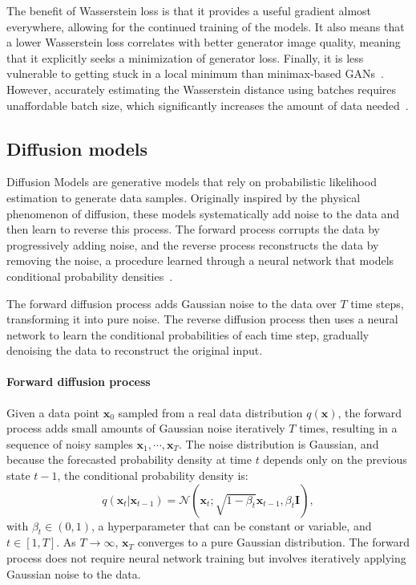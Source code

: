 \documentclass[sn-mathphys-num]{sn-jnl}%
\begin{document}
    The benefit of Wasserstein loss is that it provides a useful gradient almost everywhere, allowing for the continued training of the models. It also means that a lower Wasserstein loss correlates with better generator image quality, meaning that it explicitly seeks a minimization of generator loss. Finally, it is less vulnerable to getting stuck in a local minimum than minimax-based GANs~\cite{Wasserstein}. However, accurately estimating the Wasserstein distance using batches requires unaffordable batch size, which significantly increases the amount of data needed~\cite{stanczuk2021wasserstein}.


\subsection{Diffusion models}\label{sec:diffusion}
Diffusion Models are generative models that rely on probabilistic likelihood estimation to generate data samples. Originally inspired by the physical phenomenon of diffusion, these models systematically add noise to the data and then learn to reverse this process. The forward process corrupts the data by progressively adding noise, and the reverse process reconstructs the data by removing the noise, a procedure learned through a neural network that models conditional probability densities~\cite{sohl2015deep,song2019generative,ho2020denoising}.

The forward diffusion process adds Gaussian noise to the data over $T$ time steps, transforming it into pure noise. The reverse diffusion process then uses a neural network to learn the conditional probabilities of each time step, gradually denoising the data to reconstruct the original input.

\paragraph{Forward diffusion process}
Given a data point $\mathbf{x}_0$ sampled from a real data distribution $q(\mathbf{x})$, the forward process adds small amounts of Gaussian noise iteratively $T$ times, resulting in a sequence of noisy samples $\mathbf{x}_1, \cdots, \mathbf{x}_T$. The noise distribution is Gaussian, and because the forecasted probability density at time $t$ depends only on the previous state $t-1$, the conditional probability density is:
\begin{equation}
    q(\mathbf{x}_t \vert \mathbf{x}_{t-1}) = \mathcal{N}(\mathbf{x}_t; \sqrt{1 - \beta_t} \mathbf{x}_{t-1}, \beta_t \mathbf{I}),
\end{equation}
with $\beta_t \in (0,1)$, a hyperparameter that can be constant or variable, and $t \in [1, T]$. As $T \rightarrow \infty$, $\mathbf{x}_T$ converges to a pure Gaussian distribution. The forward process does not require neural network training but involves iteratively applying Gaussian noise to the data.
\end{document}
